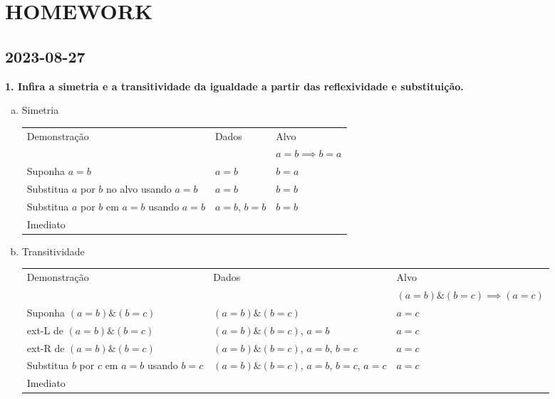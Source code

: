 \documentclass[a4paper, 12pt]{article}
\begin{document}
\section{HOMEWORK}
\subsection{2023-08-27}

\textbf{1. Infira a simetria e a transitividade da igualdade a partir das reflexividade e substituição.}
\begin{enumerate}[a.]
    \item Simetria
    \begin{table}[h!]
        \centering
        \begin{tabular}{|p{4cm} | p{4cm} | p{4cm} |}
        \rowcolor{gray!50}
            Demonstração & Dados & Alvo \\
            && $a = b \implies b = a$  \\
            Suponha $a = b$ & $a = b$ & $b = a$\\
            Substitua $a$ por $b$ no alvo usando $a = b$ & $a=b$&$b=b$\\
            Substitua $a$ por $b$ em $a = b$ usando $a=b$ & $a=b$, $b=b$&$b=b$\\
            Imediato &&\\
            \hline
            \end{tabular}
    \end{table}

    \item Transitividade
    \begin{table}[h!]
        \centering
        \begin{tabular}{|p{4cm} | p{4cm} | p{4cm} |}
        \rowcolor{gray!50}
            Demonstração & Dados & Alvo \\
            && $(a = b) \& (b = c) \implies (a = c)$  \\
            Suponha $(a = b) \& (b =c)$ & $(a = b) \& (b =c)$ & $a=c$\\
            ext-L de $(a = b) \& (b =c)$ & $(a = b) \& (b =c)$, $a=b$ & $a = c$\\
            ext-R de $(a = b) \& (b =c)$ & $(a = b) \& (b =c)$, $a=b$, $b=c$ & $a=c$\\
            Substitua $b$ por $c$ em $a=b$ usando $b=c$ & $(a = b) \& (b =c)$, $a=b$, $b=c$, $a=c$ & $a=c$\\
            Imediato & & \\
            \hline
            \end{tabular}
    \end{table}
\end{enumerate}
\end{document}
